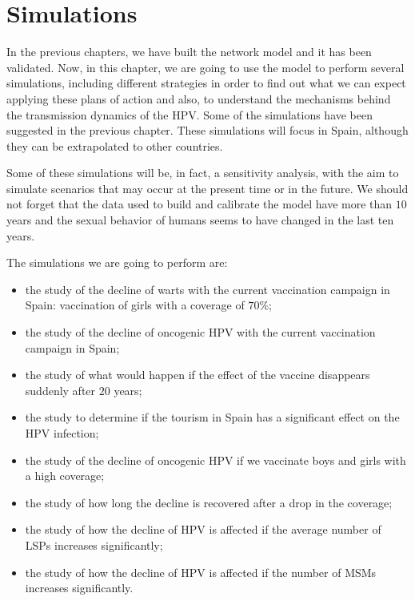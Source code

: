 \chapter{Simulations}\label{HPVSpain}
In the previous chapters, we have built the network model and it has been validated. Now, in this chapter, we are going to use the model to perform several simulations, including different strategies in order to find out what we can expect applying these plans of action and also, to understand the mechanisms behind the transmission dynamics of the HPV. Some of the simulations have been suggested in the previous chapter. These simulations will focus in Spain, although they can be extrapolated to other countries. 

Some of these simulations will be, in fact, a sensitivity analysis, with the aim to simulate scenarios that may occur at the present time or in the future. We should not forget that the data used to build and calibrate the model have more than $10$ years and the sexual behavior of humans seems to have changed in the last ten years.

The simulations we are going to perform are:

\begin{itemize}
\item the study of the decline of warts with the current vaccination campaign in Spain: vaccination of girls with a coverage of $70\%$;
\item the study of the decline of oncogenic HPV with the current vaccination campaign in Spain;
\item the study of what would happen if the effect of the vaccine disappears suddenly after $20$ years;
\item the study to determine if the tourism in Spain has a significant effect on the HPV infection;
\item the study of the decline of oncogenic HPV if we vaccinate boys and girls with a high coverage;
\item the study of how long the decline is recovered after a drop in the coverage;
\item the study of how the decline of HPV is affected  if the average number of LSPs increases significantly;
\item the study of how the decline of HPV is affected  if the number of MSMs increases significantly.
\end{itemize}

